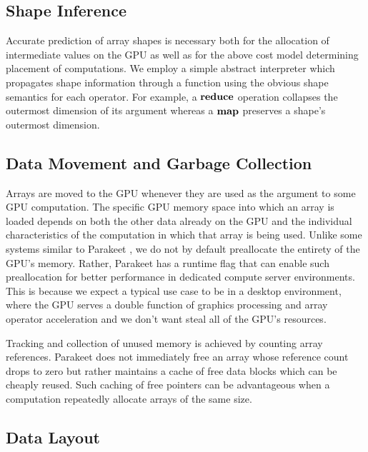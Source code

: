 \documentclass[10pt,twocolumn]{article}
\begin{document}
\subsection{Shape Inference}
\label{shapeinference}
Accurate prediction of array shapes is necessary both for the allocation of intermediate values on the GPU as well as for the above cost model determining placement of computations. We employ a simple abstract interpreter which propagates shape information through a function using the obvious shape semantics for each operator. For example, a $\mbox{\textbf{reduce}}$ operation collapses the outermost dimension of its argument whereas a $\mbox{\textbf{map}}$ preserves a shape's outermost dimension.

\subsection{Data Movement and Garbage Collection} 
Arrays are moved to the GPU whenever they are used as the argument to some GPU computation. The specific GPU memory space into which an array is loaded depends on both the other data already on the GPU and the individual characteristics of the computation in which that array is being used.
Unlike some systems similar to Parakeet \cite{Chaf11}, we do not by default preallocate the entirety of the GPU's memory.  Rather, Parakeet has a runtime flag that can enable such preallocation for better performance in dedicated compute server environments.  This is because we expect a typical use case to be in a desktop environment, where the GPU serves a double function of graphics processing and array operator acceleration and we don't want steal all of the GPU's resources.

Tracking and collection of unused memory is achieved by counting array references. Parakeet does not immediately free an array whose reference count drops to zero but rather maintains a cache of free data blocks which can be cheaply reused. Such caching of free pointers can be advantageous when a computation repeatedly allocate arrays of the same size. 

\subsection{Data Layout}
\label{datalayout}
\end{document}
